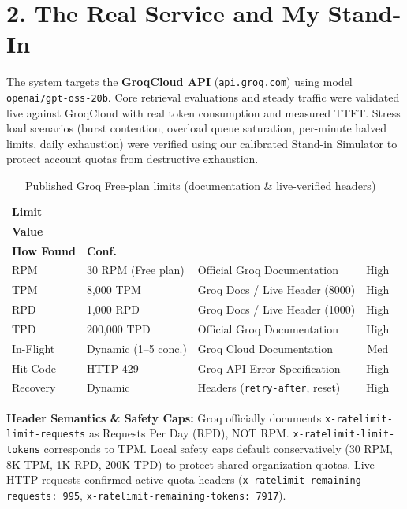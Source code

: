 \documentclass[9pt,twocolumn]{article}
\begin{document}
\section{2. The Real Service and My Stand-In}
The system targets the \textbf{GroqCloud API} (\texttt{api.groq.com}) using model \texttt{openai/gpt-oss-20b}. Core retrieval evaluations and steady traffic were validated live against GroqCloud with real token consumption and measured TTFT. Stress load scenarios (burst contention, overload queue saturation, per-minute halved limits, daily exhaustion) were verified using our calibrated Stand-in Simulator to protect account quotas from destructive exhaustion.

\begin{table}[h]
\centering
\caption{\footnotesize Published Groq Free-plan limits (documentation \& live-verified headers)}
\vspace{2pt}
\fontsize{6.8pt}{8.0pt}\selectfont
\setlength{\tabcolsep}{2.5pt}
\begin{tabularx}{\columnwidth}{@{} p{0.50in} p{0.78in} X c @{}}
\toprule
\textbf{Limit} & \shortstack[l]{\textbf{Published}\\\textbf{Value}} & \shortstack[l]{\textbf{Source /}\\\textbf{How Found}} & \textbf{Conf.} \\
\midrule
RPM & 30 RPM (Free plan) & Official Groq Documentation & High \\
TPM & 8,000 TPM & Groq Docs / Live Header (8000) & High \\
RPD & 1,000 RPD & Groq Docs / Live Header (1000) & High \\
TPD & 200,000 TPD & Official Groq Documentation & High \\
In-Flight & Dynamic (1--5 conc.) & Groq Cloud Documentation & Med \\
Hit Code & HTTP 429 & Groq API Error Specification & High \\
Recovery & Dynamic & Headers (\texttt{retry-after}, reset) & High \\
\bottomrule
\end{tabularx}
\end{table}

\textbf{Header Semantics \& Safety Caps:} Groq officially documents \texttt{x-ratelimit-limit-requests} as Requests Per Day (RPD), NOT RPM. \texttt{x-ratelimit-limit-tokens} corresponds to TPM. Local safety caps default conservatively (30 RPM, 8K TPM, 1K RPD, 200K TPD) to protect shared organization quotas. Live HTTP requests confirmed active quota headers (\texttt{x-ratelimit-remaining-requests: 995}, \texttt{x-ratelimit-remaining-tokens: 7917}).
\end{document}
